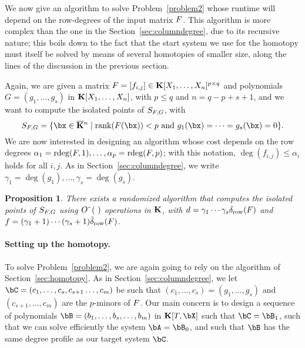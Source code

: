 \documentclass[12pt]{article}
\newtheorem{proposition}[definition]{Proposition}
\begin{document}
We now give an algorithm to solve Problem~\ref{problem2} whose runtime
will depend on the row-degrees of the input matrix ${F}$. This
algorithm is more complex than the one in the
Section~\ref{sec:columndegree}, due to its recursive nature; this
boils down to the fact that the start system we use for the homotopy
must itself be solved by means of several homotopies of smaller size,
along the lines of the discussion in the previous section.

Again, we are given a matrix ${F} =[f_{i,j}]\in \mathbf{K}[X_1,\dots,X_n]^{p
  \times q}$ and polynomials $G=(g_1,\dots,g_s)$ in
$\mathbf{K}[X_1,\dots,X_n]$, with $p \leq q$ and $n = q-p+s+1$, and we want to
compute the isolated points of $S_{{F},G}$, with
$$S_{\mF,G} = \{\bx \in \KKbar{}^n \mid \mathrm{rank}(\mF({\bx})) < p
\text{~and~} g_1(\bx)=\cdots=g_s(\bx)=0\}.$$ We are now interested in
designing an algorithm whose cost depends on the row degrees
$\alpha_1=\mathrm{rdeg}({F},1),\dots,\alpha_p=\mathrm{rdeg}({F},p)$; with this
notation, $\deg(f_{i,j}) \leq \alpha_i$ holds for all $i,j$. As in 
Section~\ref{sec:columndegree}, we write
$\gamma_1=\deg(g_1),\dots,\gamma_s=\deg(g_s)$.

\begin{proposition}\label{prop:rowdegree}
  There exists a randomized algorithm that computes the isolated
  points of $S_{{F},G}$ using ${O}{\,\tilde{ }\,}\left (\ \right)$ operations in
  $\mathbf{K}$, with $d=\gamma_1\cdots\gamma_s \delta_{\rm row}({F})$ and
  $f=(\gamma_1+1)\cdots(\gamma_s+1) \tilde\delta_{\rm row}({F})$.
\end{proposition}



\paragraph{Setting up the homotopy.}
To solve Problem~\ref{problem2}, we are again going to rely on the
algorithm of Section~\ref{sec:homotopy}. As in Section~\ref{sec:columndegree},
we let $\bC=(c_1,\dots,c_s,c_{s+1}\dots,c_m)$ be such that
$(c_1,\dots,c_s)=(g_1,\dots,g_s)$ and $(c_{s+1},\dots,c_m)$ are the
$p$-minors of ${F}$. Our main concern is to design a sequence of
polynomials $\bB=(b_1,\dots,b_s,\dots,b_m)$ in $\KK[T,\bX]$ such that
$\bC=\bB_1$, such that we can solve efficiently the system
$\bA=\bB_0$, and such that $\bB$ has the same degree profile as our target system
$\bC$.
\end{document}
